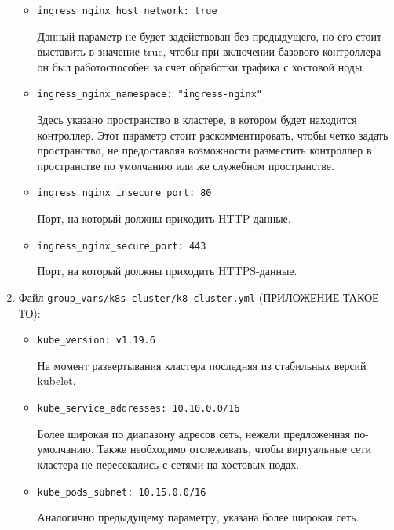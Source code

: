 \begin{enumerate}
\begin{itemize}
            \item \texttt{ingress\_nginx\_host\_network: true}

                Данный параметр не будет задействован без предыдущего, но его стоит выставить в значение true, чтобы при включении базового контроллера он был работоспособен за счет обработки трафика с хостовой ноды.

            \item \texttt{ingress\_nginx\_namespace: "ingress-nginx"}

                Здесь указано пространство в кластере, в котором будет находится контроллер. Этот параметр стоит раскомментировать, чтобы четко задать пространство, не предоставляя возможности разместить контроллер в пространстве по умолчанию или же служебном пространстве.

            \item \texttt{ingress\_nginx\_insecure\_port: 80}

                Порт, на который должны приходить HTTP-данные.

            \item \texttt{ingress\_nginx\_secure\_port: 443}

                Порт, на который должны приходить HTTPS-данные.

        \end{itemize}
    \item Файл \texttt{group\_vars/k8s-cluster/k8-cluster.yml} (ПРИЛОЖЕНИЕ ТАКОЕ-ТО):
        \begin{itemize}
            \item \texttt{kube\_version: v1.19.6}

                На момент развертывания кластера последняя из стабильных версий kubelet.

            \item \texttt{kube\_service\_addresses: 10.10.0.0/16}

                Более широкая по диапазону адресов сеть, нежели предложенная по-умолчанию. Также необходимо отслеживать, чтобы виртуальные сети кластера не пересекались с сетями на хостовых нодах.

            \item \texttt{kube\_pods\_subnet: 10.15.0.0/16}

                Аналогично предыдущему параметру, указана более широкая сеть.


\end{itemize}
\end{enumerate}

